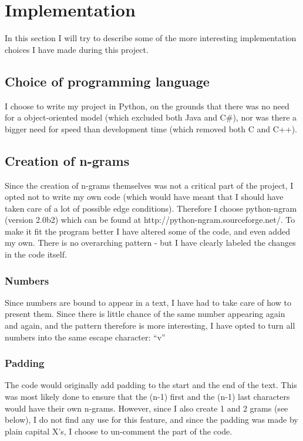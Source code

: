 \section{Implementation}

In this section I will try to describe some of the more interesting implementation choices I have made during this project.

\subsection{Choice of programming language}
I choose to write my project in Python, on the grounds that there was no need for a object-oriented model (which excluded both Java and C\#), nor was there a bigger need for speed than development time (which removed both C and C++).

\subsection{Creation of n-grams}
Since the creation of n-grams themselves was not a critical part of the project, I opted not to write my own code (which would have meant that I should have taken care of a lot of possible edge conditions). Therefore I choose python-ngram (version 2.0b2) which can be found at http://python-ngram.sourceforge.net/. To make it fit the program better I have altered some of the code, and even added my own. There is no overarching pattern - but I have clearly labeled the changes in the code itself.
\subsubsection{Numbers}
Since numbers are bound to appear in a text, I have had to take care of how to present them. Since there is little chance of the same number appearing again and again, and the pattern therefore is more interesting, I have opted to turn all numbers into the same escape character: ``\backspace v''
\subsubsection{Padding}
The code would originally add padding to the start and the end of the text. This was most likely done to ensure that the (n-1) first and the (n-1) last characters would have their own n-grams. However, since I also create 1 and 2 grams (see below), I do not find any use for this feature, and since the padding was made by plain capital X's, I choose to un-comment the part of the code.

